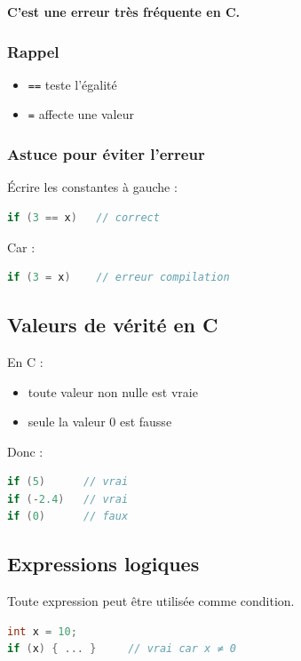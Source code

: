 \textbf{C’est une erreur très fréquente en C.}

\subsubsection{Rappel}

\begin{itemize}
    \item \texttt{==} teste l’égalité
    \item \texttt{=} affecte une valeur
\end{itemize}

\subsubsection{Astuce pour éviter l’erreur}

Écrire les constantes à gauche :

\begin{lstlisting}[language=C]
if (3 == x)   // correct
\end{lstlisting}

Car :

\begin{lstlisting}[language=C]
if (3 = x)    // erreur compilation
\end{lstlisting}

\subsection{Valeurs de vérité en C}

En C :

\begin{itemize}
    \item toute valeur non nulle est vraie
    \item seule la valeur 0 est fausse
\end{itemize}

Donc :

\begin{lstlisting}[language=C]
if (5)      // vrai
if (-2.4)   // vrai
if (0)      // faux
\end{lstlisting}

\subsection{Expressions logiques}

Toute expression peut être utilisée comme condition.

\begin{lstlisting}[language=C]
int x = 10;
if (x) { ... }     // vrai car x ≠ 0
\end{lstlisting}

